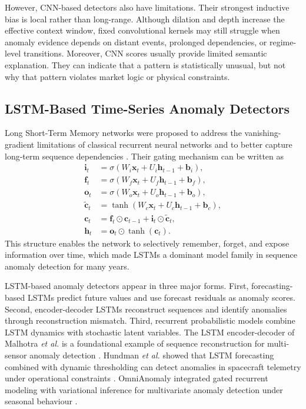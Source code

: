 However, CNN-based detectors also have limitations. Their strongest inductive bias is local rather than long-range. Although dilation and depth increase the effective context window, fixed convolutional kernels may still struggle when anomaly evidence depends on distant events, prolonged dependencies, or regime-level transitions. Moreover, CNN scores usually provide limited semantic explanation. They can indicate that a pattern is statistically unusual, but not why that pattern violates market logic or physical constraints.

\subsection{LSTM-Based Time-Series Anomaly Detectors}

Long Short-Term Memory networks were proposed to address the vanishing-gradient limitations of classical recurrent neural networks and to better capture long-term sequence dependencies \cite{hochreiter1997long}. Their gating mechanism can be written as
\begin{align}
	\mathbf{i}_t &= \sigma(W_i \mathbf{x}_t + U_i \mathbf{h}_{t-1} + \mathbf{b}_i), \\
	\mathbf{f}_t &= \sigma(W_f \mathbf{x}_t + U_f \mathbf{h}_{t-1} + \mathbf{b}_f), \\
	\mathbf{o}_t &= \sigma(W_o \mathbf{x}_t + U_o \mathbf{h}_{t-1} + \mathbf{b}_o), \\
	\tilde{\mathbf{c}}_t &= \tanh(W_c \mathbf{x}_t + U_c \mathbf{h}_{t-1} + \mathbf{b}_c), \\
	\mathbf{c}_t &= \mathbf{f}_t \odot \mathbf{c}_{t-1} + \mathbf{i}_t \odot \tilde{\mathbf{c}}_t, \\
	\mathbf{h}_t &= \mathbf{o}_t \odot \tanh(\mathbf{c}_t).
	\label{eq:sota_lstm}
\end{align}
This structure enables the network to selectively remember, forget, and expose information over time, which made LSTMs a dominant model family in sequence anomaly detection for many years.

LSTM-based anomaly detectors appear in three major forms. First, forecasting-based LSTMs predict future values and use forecast residuals as anomaly scores. Second, encoder-decoder LSTMs reconstruct sequences and identify anomalies through reconstruction mismatch. Third, recurrent probabilistic models combine LSTM dynamics with stochastic latent variables. The LSTM encoder-decoder of Malhotra \emph{et al.} is a foundational example of sequence reconstruction for multi-sensor anomaly detection \cite{malhotra2016encdecad}. Hundman \emph{et al.} showed that LSTM forecasting combined with dynamic thresholding can detect anomalies in spacecraft telemetry under operational constraints \cite{hundman2018spacecraft}. OmniAnomaly integrated gated recurrent modeling with variational inference for multivariate anomaly detection under seasonal behaviour \cite{su2019omnianomaly}.

